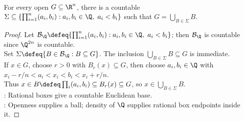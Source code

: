 \begin{lemma} \label{lem:open-sets-countable-unions-rational-boxes} \\
For every open $G\subseteq\R^n$, there is a countable $\Sigma\subseteq\{\prod_{i=1}^{n}(a_i,b_i):a_i,b_i\in\Q,\ a_i<b_i\}$ such that $G=\bigcup_{B\in\Sigma}B$.
\begin{proof}
Let $\mathcal{B}_{\Q}\defeq\{\prod_{i=1}^{n}(a_i,b_i):a_i,b_i\in\Q,\ a_i<b_i\}$; then $\mathcal{B}_{\Q}$ is countable since $\Q^{2n}$ is countable.\\
Set $\Sigma\defeq\{B\in\mathcal{B}_{\Q}:B\subseteq G\}$. The inclusion $\bigcup_{B\in\Sigma}B\subseteq G$ is immediate.\\
If $x\in G$, choose $r>0$ with $B_r(x)\subseteq G$, then choose $a_i,b_i\in\Q$ with $x_i-r/n<a_i<x_i<b_i<x_i+r/n$.\\
Thus $x\in B\defeq\prod_i(a_i,b_i)\subseteq B_r(x)\subseteq G$, so $x\in\bigcup_{B\in\Sigma}B$.\\
: Rational boxes give a countable Euclidean base.\\
: Openness supplies a ball; density of $\Q$ supplies rational box endpoints inside it.
\end{proof}
\end{lemma}

